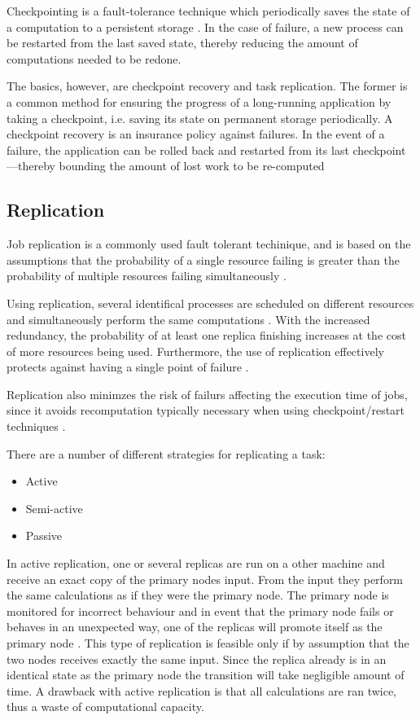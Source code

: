 \documentclass{cslthse-msc}
\begin{document}
Checkpointing is a fault-tolerance technique which periodically saves the state of a computation to a persistent storage \cite{relGridSystems} \cite{surveyFaultParallel}. In the case of failure, a new process can be restarted from the last saved state, thereby reducing the amount of computations needed to be redone.

The basics, however, are checkpoint recovery and task replication. The former is a common method for ensuring the progress of a long-running application by taking a checkpoint, i.e. saving its state on permanent storage periodically. A checkpoint recovery is an insurance policy against failures. In the event of a failure, the application can be rolled back and restarted from its last checkpoint—thereby bounding the amount of lost work to be re-computed \cite{effTaskReplMobGrid}

\subsection{Replication}
Job replication is a commonly used fault tolerant techinique, and is based on the assumptions that the probability of a single resource failing is greater than the probability of multiple resources failing simultaneously \cite{faultToleranceGrid}.

Using replication, several identifical processes are scheduled on different resources and simultaneously perform the same computations \cite{relGridSystems}. With the increased redundancy, the probability of at least one replica finishing increases at the cost of more resources being used. Furthermore, the use of replication effectively protects against having a single point of failure \cite{faultToleranceGrid}.

Replication also minimzes the risk of failurs affecting the execution time of jobs, since it avoids recomputation typically necessary when using checkpoint/restart techniques \cite{designFaultTolerantSched}.

There are a number of different strategies for replicating a task:
\begin{itemize}
\item Active
\item Semi-active
\item Passive
\end{itemize}

In active replication, one or several replicas are run on a other machine and receive an exact copy of the primary nodes input. From the input they perform the same calculations as if they were the primary node. The primary node is monitored for incorrect behaviour and in event that the primary node fails or behaves in an unexpected way, one of the replicas will promote itself as the primary node \cite{surveyFaultParallel}. This type of replication is feasible only if by assumption that the two nodes receives exactly the same input. Since the replica already is in an identical state as the primary node the transition will take negligible amount of time. A drawback with active replication is that all calculations are ran twice, thus a waste of computational capacity. 
\end{document}
